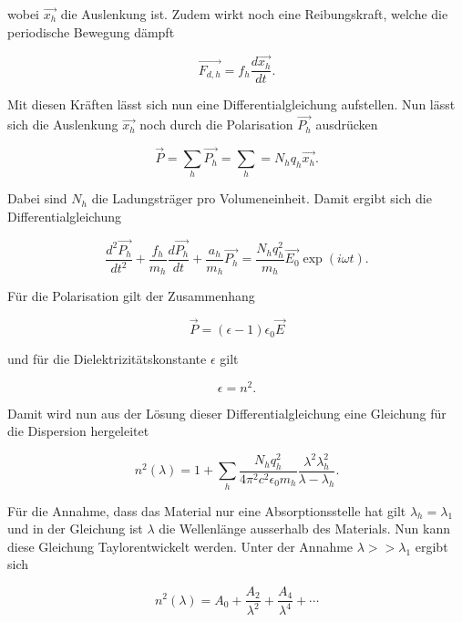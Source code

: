 wobei $\vec{x_h}$ die Auslenkung ist. Zudem wirkt noch eine Reibungskraft, welche die
periodische Bewegung dämpft

\begin{equation*}
  \vec{F_{d,h}} = f_h \frac{d \vec{x_h}}{dt}.
\end{equation*}

Mit diesen Kräften lässt sich nun eine Differentialgleichung aufstellen. Nun lässt sich
die Auslenkung $\vec{x_h}$ noch durch die Polarisation $\vec{P_h}$ ausdrücken

\begin{equation*}
  \vec{P} = \sum_h \vec{P_h} = \sum_h = N_h q_h \vec{x_h}.
\end{equation*}

Dabei sind $N_h$ die Ladungsträger pro Volumeneinheit. Damit ergibt sich die
Differentialgleichung

\begin{equation*}
  \frac{d^2\vec{P_h}}{dt^2} + \frac{f_h}{m_h} \frac{d\vec{P_h}}{dt} + \frac{a_h}{m_h} \vec{P_h}
  = \frac{N_h q_h^2}{m_h} \vec{E_0} \exp(i \omega t).
\end{equation*}

Für die Polarisation gilt der Zusammenhang

\begin{equation*}
  \vec{P} = (\epsilon - 1) \epsilon_0 \vec{E}
\end{equation*}

und für die Dielektrizitätskonstante $\epsilon$ gilt

\begin{equation*}
  \epsilon = n^2.
\end{equation*}

Damit wird nun aus der Lösung dieser Differentialgleichung eine Gleichung für die
Dispersion hergeleitet

\begin{equation*}
  n^2(\lambda) = 1 + \sum_h \frac{N_h q_h^2}{4 \pi^2 c^2 \epsilon_0 m_h} \frac{\lambda^2 \lambda_h^2}{\lambda - \lambda_h}.
\end{equation*}

Für die Annahme, dass das Material nur eine Absorptionsstelle hat gilt $\lambda_h = \lambda_1$ und
in der Gleichung ist $\lambda$ die Wellenlänge ausserhalb des Materials.
Nun kann diese Gleichung Taylorentwickelt werden. Unter der Annahme $\lambda >> \lambda_1$
ergibt sich

\begin{equation}
  n^2(\lambda) = A_0 + \frac{A_2}{\lambda^2} + \frac{A_4}{\lambda^4} + \dotsb
  \label{eq:3}
\end{equation}

